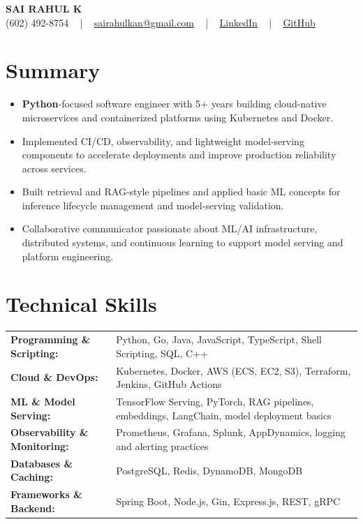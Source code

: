 \documentclass[letterpaper,11pt]{article}
\newcommand{\resumeItem}[1]{
  \item\footnotesize{
    {#1 \vspace{-2pt}}
  }
}
\newcommand{\resumeItemListStart}{\begin{itemize}[leftmargin=*]}
\newcommand{\resumeItemListEnd}{\end{itemize}\vspace{-5pt}}
\begin{document}
\begin{center}
    {\fontsize{14pt}{12pt}\selectfont \textbf{\MakeUppercase{Sai Rahul K}}}\\ \vspace{2pt}
    \fontsize{10pt}{12pt}\selectfont (602) 492-8754 ~ | ~ \href{mailto:sairahulkan@gmail.com}{sairahulkan@gmail.com} ~ | ~
    \href{https://www.linkedin.com/in/rq123/}{\color{blue}\underline{LinkedIn}} ~ | ~
    \href{https://github.com/kanrahuldo}{\color{blue}\underline{GitHub}}~
    \vspace{-8pt}
\end{center}

\section{Summary}
\fontsize{9pt}{10pt}\selectfont
\resumeItemListStart
    \resumeItem{\textbf{Python}-focused software engineer with 5+ years building cloud-native microservices and containerized platforms using Kubernetes and Docker.}
    \resumeItem{Implemented CI/CD, observability, and lightweight model-serving components to accelerate deployments and improve production reliability across services.}
    \resumeItem{Built retrieval and RAG-style pipelines and applied basic ML concepts for inference lifecycle management and model-serving validation.}
    \resumeItem{Collaborative communicator passionate about ML/AI infrastructure, distributed systems, and continuous learning to support model serving and platform engineering.}
\resumeItemListEnd
\vspace{-6pt}

\section{Technical Skills}
        \vspace{-14pt}
        \begin{table}[h]
            \fontsize{9pt}{10pt}\selectfont
            \begin{tabular}{p{0.3\linewidth} p{0.7\linewidth}}
                \textbf{Programming \& Scripting:} & Python, Go, Java, JavaScript, TypeScript, Shell Scripting, SQL, C++ \\
                \textbf{Cloud \& DevOps:} & Kubernetes, Docker, AWS (ECS, EC2, S3), Terraform, Jenkins, GitHub Actions \\
                \textbf{ML \& Model Serving:} & TensorFlow Serving, PyTorch, RAG pipelines, embeddings, LangChain, model deployment basics \\
                \textbf{Observability \& Monitoring:} & Prometheus, Grafana, Splunk, AppDynamics, logging and alerting practices \\
                \textbf{Databases \& Caching:} & PostgreSQL, Redis, DynamoDB, MongoDB \\
                \textbf{Frameworks \& Backend:} & Spring Boot, Node.js, Gin, Express.js, REST, gRPC \\
            \end{tabular}
        \end{table}
    \vspace{-15pt}
\end{document}
